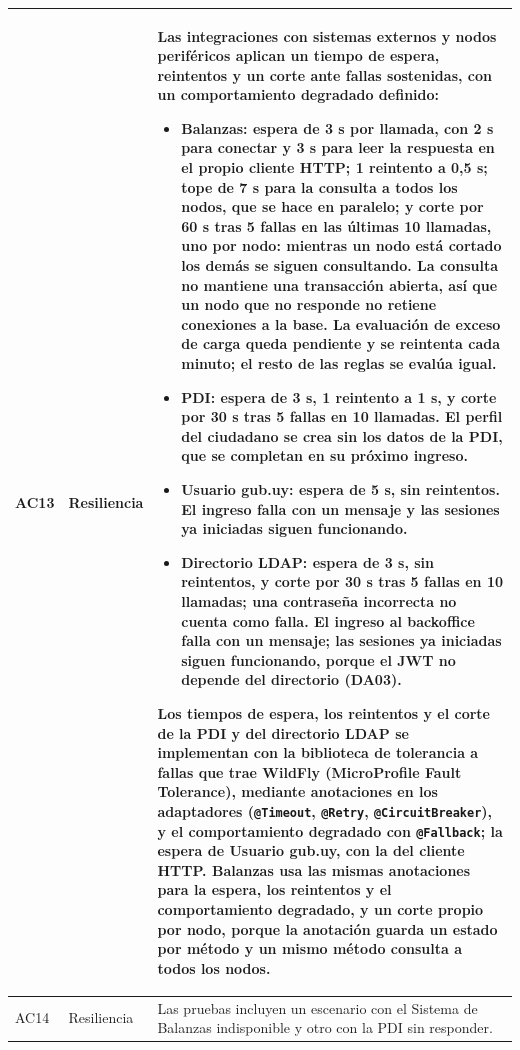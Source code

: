 \begin{longtable}{|p{1.3cm}|p{2.7cm}|p{11.5cm}|}
    \hline
    AC13 & Resiliencia & Las integraciones con sistemas externos y nodos periféricos aplican un tiempo de espera, reintentos y un corte ante fallas sostenidas, con un comportamiento degradado definido:
    \begin{itemize}[leftmargin=*,topsep=2pt,itemsep=1pt,parsep=0pt,partopsep=0pt]
        \item \textbf{Balanzas:} espera de 3 s por llamada, con 2 s para conectar y 3 s para leer la respuesta en el propio cliente HTTP; 1 reintento a 0,5 s; tope de 7 s para la consulta a todos los nodos, que se hace en paralelo; y corte por 60 s tras 5 fallas en las últimas 10 llamadas, uno por nodo: mientras un nodo está cortado los demás se siguen consultando. La consulta no mantiene una transacción abierta, así que un nodo que no responde no retiene conexiones a la base. La evaluación de exceso de carga queda pendiente y se reintenta cada minuto; el resto de las reglas se evalúa igual.
        \item \textbf{PDI:} espera de 3 s, 1 reintento a 1 s, y corte por 30 s tras 5 fallas en 10 llamadas. El perfil del ciudadano se crea sin los datos de la PDI, que se completan en su próximo ingreso.
        \item \textbf{Usuario gub.uy:} espera de 5 s, sin reintentos. El ingreso falla con un mensaje y las sesiones ya iniciadas siguen funcionando.
        \item \textbf{Directorio LDAP:} espera de 3 s, sin reintentos, y corte por 30 s tras 5 fallas en 10 llamadas; una contraseña incorrecta no cuenta como falla. El ingreso al backoffice falla con un mensaje; las sesiones ya iniciadas siguen funcionando, porque el JWT no depende del directorio (DA03).
    \end{itemize}
    Los tiempos de espera, los reintentos y el corte de la PDI y del directorio LDAP se implementan con la biblioteca de tolerancia a fallas que trae WildFly (MicroProfile Fault Tolerance), mediante anotaciones en los adaptadores (\texttt{@Timeout}, \texttt{@Retry}, \texttt{@CircuitBreaker}), y el comportamiento degradado con \texttt{@Fallback}; la espera de Usuario gub.uy, con la del cliente HTTP. Balanzas usa las mismas anotaciones para la espera, los reintentos y el comportamiento degradado, y un corte propio por nodo, porque la anotación guarda un estado por método y un mismo método consulta a todos los nodos. \\
    \hline
    AC14 & Resiliencia & Las pruebas incluyen un escenario con el Sistema de Balanzas indisponible y otro con la PDI sin responder. \\

\end{longtable}
